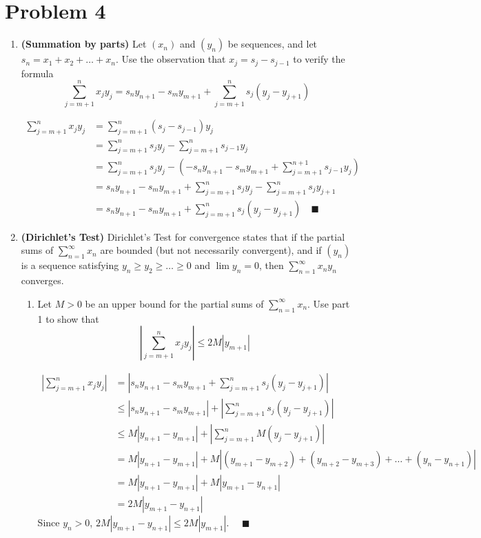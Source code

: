 \documentclass[12pt]{article}
\newcommand{\qed}{\quad \blacksquare}
\newcommand{\abs}[1]{\left\vert #1 \right\vert}
\begin{document}
\pagebreak

\section*{Problem 4}
\begin{enumerate}
    \item \textbf{(Summation by parts)}  Let $(x_n)$ and $(y_n)$ be sequences, and let $s_n = x_1 + x_2 + \dots + x_n$. Use the observation that $x_j = s_j - s_{j-1}$ to verify the formula
    \[\sum_{j=m+1}^n x_jy_j = s_ny_{n+1} -s_m y_{m+1} + \sum_{j=m+1}^n s_j(y_j - y_{j+1})\]

        \color{blue}
            \begin{align*}
                \sum_{j=m+1}^n x_jy_j &= \sum_{j=m+1}^{n}(s_j - s_{j-1})y_j\\ 
                &= \sum_{j=m+1}^{n} s_jy_j - \sum_{j=m+1}^{n} s_{j-1}y_j\\
                &= \sum_{j=m+1}^{n} s_jy_j - \left(-s_ny_{n+1} - s_my_{m+1} + \sum_{j=m+1}^{n+1} s_{j-1}y_{j}\right)\\
                &= s_ny_{n+1} - s_my_{m+1} + \sum_{j=m+1}^n s_jy_j - \sum_{j=m+1}^n s_jy_{j+1}\\
                &= s_ny_{n+1} - s_my_{m+1} + \sum_{j=m+1}^n s_j(y_j - y_{j+1}) \qed
                \end{align*}
        \color{black}

    \item \textbf{(Dirichlet's Test)} Dirichlet's Test for convergence states that if the partial sums of $\sum_{n=1}^{\infty} x_n$ are bounded (but not necessarily convergent), and if $(y_n)$ is a sequence satisfying $y_n \geq y_2 \geq \dots \geq 0$ and $\lim y_n = 0$, then $\sum_{n=1}^{\infty} x_ny_n$ converges. 
    \begin{enumerate}[label=(\alph*)]
        \item Let $M > 0$ be an upper bound for the partial sums of $\sum_{n=1}^{\infty} x_n$. Use part 1 to show that 
        \[\abs{\sum_{j=m+1}^n x_jy_j} \leq 2M\abs{y_{m+1}}\] 

            \color{blue}
                \begin{align*}
                    \abs{\sum_{j=m+1}^n x_jy_j} &= \abs{s_ny_{n+1} - s_my_{m+1} + \sum_{j=m+1}^n s_j(y_j - y_{j+1})}\\ 
                        &\leq \abs{s_ny_{n+1} - s_my_{m+1}} + \abs{\sum_{j=m+1}^n s_j(y_j - y_{j+1})}\\
                        &\leq M\abs{y_{n+1} - y_{m+1}} + \abs{\sum_{j=m+1}^n M(y_j - y_{j+1})}\\
                        &= M\abs{y_{n+1}- y_{m+1}} + M\abs{(y_{m+1} - y_{m+2}) + (y_{m+2} - y_{m+3}) + \dots + (y_n - y_{n+1})}\\
                        &= M\abs{y_{n+1}- y_{m+1}} + M\abs{y_{m+1} - y_{n+1}}\\
                        &= 2M\abs{y_{m+1} - y_{n+1}}
                \end{align*}
                Since $y_n > 0$, $2M \abs{y_{m+1} - y_{n+1}} \leq 2M\abs{y_{m+1}}$. $\qed$
            \color{black}


\end{enumerate}
\end{enumerate}
\end{document}
